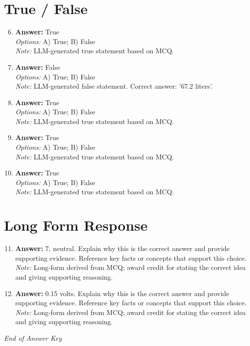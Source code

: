 \documentclass[12pt]{article}
\begin{document}
\section*{True / False}
\begin{enumerate}[label=\arabic*.]
\setcounter{enumi}{5}
\item \textbf{Answer:} True
\\ \textit{Options:} A) True; B) False
\\ \textit{Note:} LLM-generated true statement based on MCQ.
\item \textbf{Answer:} False
\\ \textit{Options:} A) True; B) False
\\ \textit{Note:} LLM-generated false statement. Correct answer: '67.2 liters'.
\item \textbf{Answer:} True
\\ \textit{Options:} A) True; B) False
\\ \textit{Note:} LLM-generated true statement based on MCQ.
\item \textbf{Answer:} True
\\ \textit{Options:} A) True; B) False
\\ \textit{Note:} LLM-generated true statement based on MCQ.
\item \textbf{Answer:} True
\\ \textit{Options:} A) True; B) False
\\ \textit{Note:} LLM-generated true statement based on MCQ.
\end{enumerate}

\section*{Long Form Response}
\begin{enumerate}[label=\arabic*.]
\setcounter{enumi}{10}
\item \textbf{Answer:} 7, neutral. Explain why this is the correct answer and provide supporting evidence. Reference key facts or concepts that support this choice.
\\ \textit{Note:} Long-form derived from MCQ; award credit for stating the correct idea and giving supporting reasoning.
\item \textbf{Answer:} 0.15 volts. Explain why this is the correct answer and provide supporting evidence. Reference key facts or concepts that support this choice.
\\ \textit{Note:} Long-form derived from MCQ; award credit for stating the correct idea and giving supporting reasoning.
\end{enumerate}

\vfill
\noindent\textit{End of Answer Key}
\end{document}
